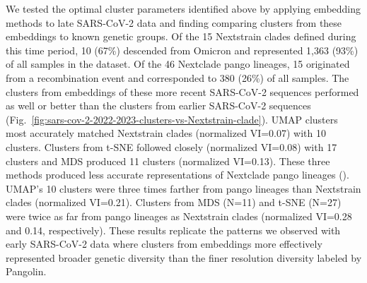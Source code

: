 \documentclass[10pt,letterpaper]{article}
\begin{document}
We tested the optimal cluster parameters identified above by applying embedding methods to late SARS-CoV-2 data and finding comparing clusters from these embeddings to known genetic groups.
Of the 15 Nextstrain clades defined during this time period, 10 (67\%) descended from Omicron and represented 1,363 (93\%) of all samples in the dataset.
Of the 46 Nextclade pango lineages, 15 originated from a recombination event and corresponded to 380 (26\%) of all samples.
The clusters from embeddings of these more recent SARS-CoV-2 sequences performed as well or better than the clusters from earlier SARS-CoV-2 sequences (Fig.~\ref{fig:sars-cov-2-2022-2023-clusters-vs-Nextstrain-clade}).
UMAP clusters most accurately matched Nextstrain clades (normalized VI=0.07) with 10 clusters.
Clusters from t-SNE followed closely (normalized VI=0.08) with 17 clusters and MDS produced 11 clusters (normalized VI=0.13).
These three methods produced less accurate representations of Nextclade pango lineages ().
UMAP's 10 clusters were three times farther from pango lineages than Nextstrain clades (normalized VI=0.21).
Clusters from MDS (N=11) and t-SNE (N=27) were twice as far from pango lineages as Nextstrain clades (normalized VI=0.28 and 0.14, respectively).
These results replicate the patterns we observed with early SARS-CoV-2 data where clusters from embeddings more effectively represented broader genetic diversity than the finer resolution diversity labeled by Pangolin.
\end{document}
